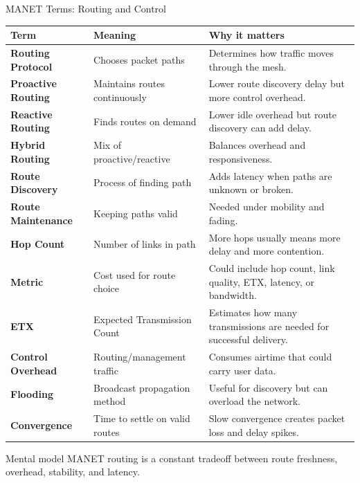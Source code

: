 \documentclass[aspectratio=169]{beamer}
\begin{document}
\begin{frame}{MANET Terms: Routing and Control}
\tiny
\begin{tabular}{p{2.0cm} p{3.4cm} p{6.7cm}}
\toprule
\textbf{Term} & \textbf{Meaning} & \textbf{Why it matters} \\
\midrule
\textbf{Routing Protocol} & Chooses packet paths & Determines how traffic moves through the mesh. \\
\textbf{Proactive Routing} & Maintains routes continuously & Lower route discovery delay but more control overhead. \\
\textbf{Reactive Routing} & Finds routes on demand & Lower idle overhead but route discovery can add delay. \\
\textbf{Hybrid Routing} & Mix of proactive/reactive & Balances overhead and responsiveness. \\
\textbf{Route Discovery} & Process of finding path & Adds latency when paths are unknown or broken. \\
\textbf{Route Maintenance} & Keeping paths valid & Needed under mobility and fading. \\
\textbf{Hop Count} & Number of links in path & More hops usually means more delay and more contention. \\
\textbf{Metric} & Cost used for route choice & Could include hop count, link quality, ETX, latency, or bandwidth. \\
\textbf{ETX} & Expected Transmission Count & Estimates how many transmissions are needed for successful delivery. \\
\textbf{Control Overhead} & Routing/management traffic & Consumes airtime that could carry user data. \\
\textbf{Flooding} & Broadcast propagation method & Useful for discovery but can overload the network. \\
\textbf{Convergence} & Time to settle on valid routes & Slow convergence creates packet loss and delay spikes. \\
\bottomrule
\end{tabular}

\vspace{0.15cm}
\begin{block}{Mental model}
MANET routing is a constant tradeoff between route freshness, overhead, stability, and latency.
\end{block}
\end{frame}
\end{document}
